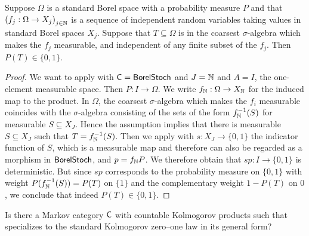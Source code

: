 \documentclass[11pt]{article}
\begin{document}
\begin{corollary}
	Suppose $\Omega$ is a standard Borel space with a probability measure $P$ and that $\left(f_j: \Omega \to X_j\right)_{j \in \mathbb{N}}$ is a sequence of independent random variables taking values in standard Borel spaces $X_j$. Suppose that $T \subseteq \Omega$ is in the coarsest $\sigma$-algebra which makes the $f_j$ measurable, and independent of any finite subset of the $f_j$. Then $P(T) \in \{0,1\}$.
\end{corollary}
\begin{proof}
	We want to apply  with $\mathsf{C} = \operatorname{\mathsf{BorelStoch}}$ and $J = \mathbb{N}$ and $A = I$, the one-element measurable space. Then $P : I \to \Omega$. We write $f_{\mathbb{N}} : \Omega \to X_{\mathbb{N}}$ for the induced map to the product. In $\Omega$, the coarsest $\sigma$-algebra which makes the $f_i$ measurable coincides with the $\sigma$-algebra consisting of the sets of the form $f_{\mathbb{N}}^{-1}(S)$ for measurable $S \subseteq X_J$. Hence the assumption implies that there is measurable $S \subseteq X_J$ such that $T = f_{\mathbb{N}}^{-1}(S)$. Then we apply  with $s : X_J \to \{0,1\}$ the indicator function of $S$, which is a measurable map and therefore can also be regarded as a morphism in $\operatorname{\mathsf{BorelStoch}}$, and $p = f_{\mathbb{N}} P$. We therefore obtain that $sp : I \to \{0,1\}$ is deterministic. But since $sp$ corresponds to the probability measure on $\{0,1\}$ with weight $P(f_{\mathbb{N}}^{-1}(S)) = P(T)$ on $\{1\}$ and the complementary weight $1 - P(T)$ on $0$, we conclude that indeed $P(T) \in \{0,1\}$.
\end{proof}

\begin{problem}
	Is there a Markov category $\mathsf{C}$ with countable Kolmogorov products such that  specializes to the standard Kolmogorov zero--one law in its general form?
\end{problem}
\end{document}
